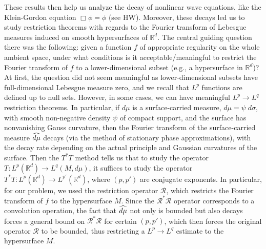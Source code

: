 \documentclass{article}
\begin{document}
	These results then help us analyze the decay of nonlinear wave equations, like the Klein-Gordon equation $\Box\phi = \phi$ (see HW). Moreover, these decays led us to study restriction theorems with regards to the Fourier transform of Lebesgue measures induced on smooth hypersurfaces of $\mathbb{R}^{d}$. The central guiding question there was the following: given a function $f$ of appropriate regularity on the whole ambient space, under what conditions is it acceptable/meaningful to restrict the Fourier transform of $f$ to a lower-dimensional subset (e.g., a hypersurface in $\mathbb{R}^{d}$)? At first, the question did not seem meaningful as lower-dimensional subsets have full-dimensional Lebesgue measure zero, and we recall that $L^{p}$ functions are defined up to null sets. However, in some cases, we can have meaningful $L^{p} \to L^{q}$ restriction theorems. In particular, if $d\mu$ is a surface-carried measure, $d\mu = \psi\;d\sigma$, with smooth non-negative density $\psi$ of compact support, and the surface has nonvanishing Gauss curvature, then the Fourier transform of the surface-carried measure $\widehat{d\mu}$ decays (via the method of stationary phase approximations), with the decay rate depending on the actual principle and Gaussian curvatures of the surface. Then the $T^{\ast}T$ method tells us that to study the operator $T: L^{p}(\mathbb{R}^{d}) \to L^{q}(M, d\mu)$, it suffices to study the operator $T^{\ast}T: L^{p}(\mathbb{R}^{d}) \to L^{p'}(\mathbb{R}^{d})$, where $(p,p')$ are conjugate exponents. In particular, for our problem, we used the restriction operator $\mathcal{R}$, which restricts the Fourier transform of $f$ to the hypersurface $M$. Since the $\mathcal{R}^{\ast}\mathcal{R}$ operator corresponds to a convolution operation, the fact that $\widehat{d\mu}$ not only is bounded but also decays forces a general bound on $\mathcal{R}^{\ast}\mathcal{R}$ for certain $(p,p')$, which then forces the original operator $\mathcal{R}$ to be bounded, thus restricting a $L^{p} \to L^{q}$ estimate to the hypersurface $M$. 
	
\end{document}

